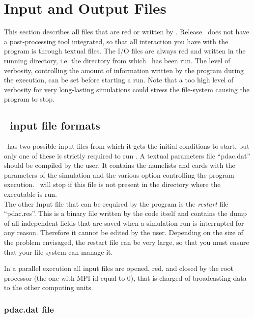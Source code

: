 \section{Input and Output Files}
\label{section:files}

This section describes all files that are red or written by \PDAC.
Release \PDACVERSION\ does not have a post-processing tool integrated,
so that all interaction you have with the program is through textual files.
The I/O files are always red and written in the running directory,
i.e. the directory from which \PDAC\ has been run.
The level of verbosity, controlling the amount of information written
by the program during the execution, can be set before starting a run.
Note that a too high level of verbosity for very long-lasting simulations
could stress the file-system causing the program to stop.

\subsection{\PDAC\ input file formats}
\label{section:input_files}

\PDAC\ has two possible input files from which it gets the initial
conditions to start, but only one of these is strictly required to run \PDAC.
A textual parameters file ``pdac.dat'' should be compiled by the user. 
It contains the namelists and cards with the parameters of the simulation
and the various option controlling the program execution.
\PDAC\ will stop if this file is not present in the directory where the 
executable is run.\\

The other Input file that can be required by the program is the {\em restart}
file ``pdac.res''. This is a binary file written by the code itself and
contains the dump of all independent fields that are saved when a
simulation run is interrupted for any reason. Therefore it cannot be edited by 
the user. Depending on the size of the problem envisaged, the restart file can 
be very large, so that you must ensure that your file-system can manage it.

In a parallel execution all input files are opened, red, and closed
by the root processor (the one with MPI id equal to 0), that
is charged of broadcasting data to the other computing units.

\subsubsection{pdac.dat file}
\label{section:padc_dat}

